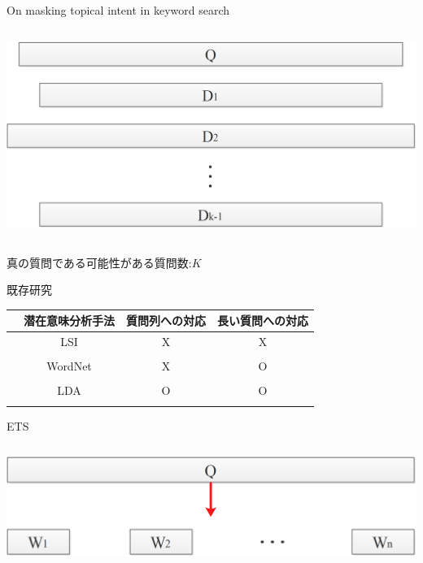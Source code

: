 \documentclass[14pt,xcolor=dvipsnames,table,dvipdfmx]{beamer}
\begin{document}
\begin{frame}{On masking topical intent in keyword search \cite{masking2014}}
	\begin{columns}[t]
		\begin{column}{0.8\textwidth} %
			\includegraphics[width=\columnwidth]{rk6.png}
		\end{column}
	\end{columns}
	\begin{block}{}
		真の質問である可能性がある質問数:$K$	
	\end{block}
\end{frame}

\begin{frame}{既存研究}
    \begin{block}{}
        \fontsize{11pt}{7.2}\selectfont
		\center
        \begin{tabular}{cccc}
        \noalign{\hrule height 1pt}
         & 潜在意味分析手法 & 質問列への対応 & 長い質問への対応  \\
        \hline
        \cite{providing2009} & LSI   & X & X \\ 
		&&&\\
        \cite{embellishing2010} & WordNet  & X & O \\
		&&&\\
        \cite{masking2014} & LDA & O & O \\
        \noalign{\hrule height 1pt}
        \end{tabular}
    \end{block}
\end{frame}

\begin{frame}{ETS}
	\begin{columns}[t]
		\begin{column}{0.8\textwidth} %
			\includegraphics[width=\columnwidth]{rk7.png}
		\end{column}
	\end{columns}
\end{frame}
\end{document}
